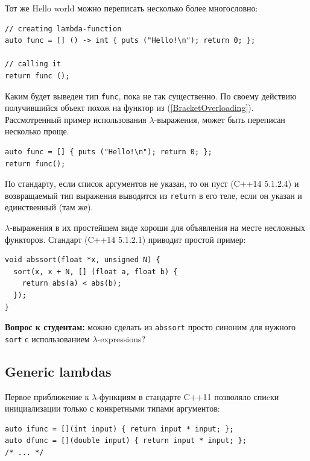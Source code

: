 \documentclass[a4paper,12pt,oneside]{book}
\newif\ifanswers
\begin{document}
Тот же Hello world можно переписать несколько более многословно:

\begin{lstlisting}
// creating lambda-function
auto func = [] () -> int { puts ("Hello!\n"); return 0; };

// calling it
return func (); 
\end{lstlisting}

Каким будет выведен тип \lstinline!func!, пока не так существенно. По своему действию получившийся объект похож на функтор из (\ref{BracketOverloading}). Рассмотренный пример использования $\lambda$-выражения, может быть переписан несколько проще.

\begin{lstlisting}
auto func = [] { puts ("Hello!\n"); return 0; };
return func(); 
\end{lstlisting}

По стандарту, если список аргументов не указан, то он пуст (C++14 5.1.2.4) и возвращаемый тип выражения выводится из \lstinline!return! в его теле, если он указан и единственный (там же).

$\lambda$-выражения в их простейшем виде хороши для объявления на месте несложных функторов. Стандарт (C++14 5.1.2.1) приводит простой пример:

\begin{lstlisting}
void abssort(float *x, unsigned N) {
  sort(x, x + N, [] (float a, float b) { 
    return abs(a) < abs(b); 
  });
}
\end{lstlisting}

\textbf{Вопрос к студентам:} можно сделать из \lstinline!abssort! просто синоним для нужного \lstinline!sort! с использованием $\lambda$-expressions?

\ifanswers
Правильный ответ: конечно и несложно \lstinline!auto abssort = [] (float *x, unsigned N) { /* ... */ }! тело то же самое
\fi

\subsection{Generic lambdas}\label{GenericLambdas}

Первое приближение к $\lambda$-функциям в стандарте C++11 позволяло спиcки инициализации только с конкретными типами аргументов:

\begin{lstlisting}
auto ifunc = [](int input) { return input * input; };
auto dfunc = [](double input) { return input * input; };
/* ... */
\end{lstlisting}
\end{document}
